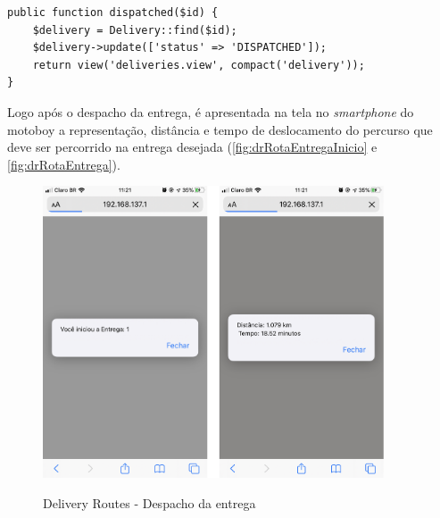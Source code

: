 \begin{lstlisting}[caption={Delivery Routes - Dispatched}, style=htmlcssjs, label=alg:funcDispatched]
public function dispatched($id) {
    $delivery = Delivery::find($id);
    $delivery->update(['status' => 'DISPATCHED']);
    return view('deliveries.view', compact('delivery'));
}
\end{lstlisting}

Logo após o despacho da entrega, é apresentada na tela no \textit{smartphone} do motoboy a representação, distância e tempo de deslocamento do percurso que deve ser percorrido na entrega desejada (\autoref{fig:drRotaEntregaInicio} e \autoref{fig:drRotaEntrega}).

\begin{figure}[H]
    \centering
    \caption{Delivery Routes - Despacho da entrega}
    \includegraphics[width=0.9\textwidth]{./dados/figuras/fig28}
    \label{fig:drRotaEntregaInicio}
\end{figure}

